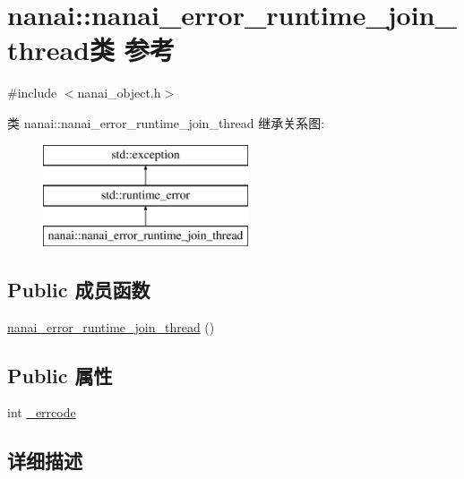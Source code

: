 \hypertarget{classnanai_1_1nanai__error__runtime__join__thread}{}\section{nanai\+:\+:nanai\+\_\+error\+\_\+runtime\+\_\+join\+\_\+thread类 参考}
\label{classnanai_1_1nanai__error__runtime__join__thread}


{\ttfamily \#include $<$nanai\+\_\+object.\+h$>$}

类 nanai\+:\+:nanai\+\_\+error\+\_\+runtime\+\_\+join\+\_\+thread 继承关系图\+:\begin{figure}[H]
\begin{center}
\leavevmode
\includegraphics[height=3.000000cm]{classnanai_1_1nanai__error__runtime__join__thread}
\end{center}
\end{figure}
\subsection*{Public 成员函数}
\begin{DoxyCompactItemize}
\item 
\hyperlink{classnanai_1_1nanai__error__runtime__join__thread_aa6319913367e8964e54866f35c763435}{nanai\+\_\+error\+\_\+runtime\+\_\+join\+\_\+thread} ()
\end{DoxyCompactItemize}
\subsection*{Public 属性}
\begin{DoxyCompactItemize}
\item 
int \hyperlink{classnanai_1_1nanai__error__runtime__join__thread_ad213745f7db3d98b873fb826187ed642}{\+\_\+errcode}
\end{DoxyCompactItemize}


\subsection{详细描述}


